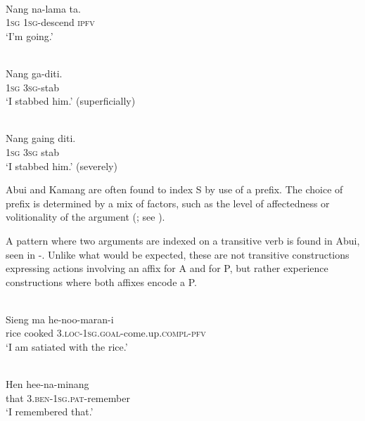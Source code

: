 \ea%
\label{ex:1:17}
 \\
\gll  Nang   na-lama   ta.  \\
 1\textsc{sg}   \textsc{1sg}{}-descend   \textsc{ipfv}  \\
\glt `I'm going.'
\z
 

\ea%
\label{ex:1:18}
 \\
\gll Nang    ga-diti. \\
1\textsc{sg}    3\textsc{sg}{}-stab     \\
\glt `I stabbed him.' (superficially)  
\z
 

  

\ea%
\label{ex:1:19}
 \\
\gll Nang  gaing   diti. \\
 1\textsc{sg}   3\textsc{sg}  stab  \\
\glt `I stabbed him.' (severely)
\z
 


Abui and Kamang are often found to index S by use of a prefix. The choice of prefix is determined by a mix of factors, such as the level of affectedness or volitionality of the argument (\citealt{FeddenEtAl2013,FeddenEtAl2014}; see \citealt{FeddenEtAlTV}). 

A pattern where two arguments are indexed on a transitive verb is found in Abui, seen in -. Unlike what would be expected, these are not transitive constructions expressing actions involving an affix for A and for P, but rather experience constructions where both affixes encode a P. 



\ea%
\label{ex:1:20}
 \\
\gll Sieng   ma     he-noo-maran-i \\
rice   cooked   3.\textsc{loc}{}-1\textsc{sg}.\textsc{goal}{}-come.up.\textsc{compl-pfv}   \\
\glt `I am satiated with the rice.'
\z
 







\ea%
\label{ex:1:21}
 \\
\gll Hen   hee-na-minang  \\
 that   3.\textsc{ben}{}-1\textsc{sg}.\textsc{pat}{}-remember  \\
\glt `I remembered that.'
\z
 
